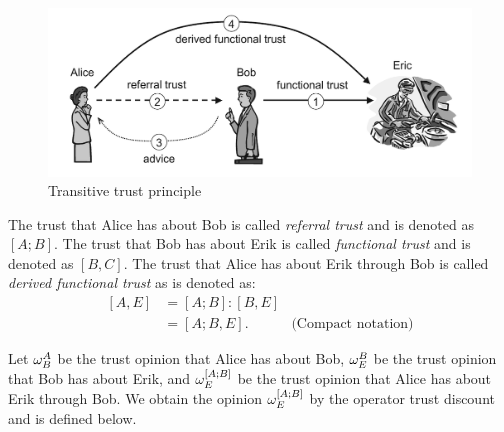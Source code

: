 \documentclass[a4paper,12pt]{article}
\theoremstyle{definition}
\numberwithin{equation}{section}
\begin{document}
\begin{figure}[htb]
	\centering
	\includegraphics[scale=0.4]{images/transitive-trust-principle.png}
	\caption{Transitive trust principle}
\end{figure}

The trust that Alice has about Bob is called \emph{referral trust} and is denoted as $[A; B]$. The trust that Bob has about Erik is called \emph{functional trust} and is denoted as $[B, C]$. The trust that Alice has about Erik through Bob is called \emph{derived functional trust} as is denoted as:
\begin{equation}
	\begin{array}{rll}
		[A, E] & = [A; B] : [B, E] \\
		& = [A; B, E] \text{.} & \text{(Compact notation)}
	\end{array}
\end{equation}

Let $\omega^{A}_{B}$ be the trust opinion that Alice has about Bob, $\omega^{B}_{E}$ be the trust opinion that Bob has about Erik, and $\omega^{[A;B]}_{E}$ be the trust opinion that Alice has about Erik through Bob. We obtain the opinion $\omega^{[A;B]}_{E}$ by the operator trust discount and is defined below.
\end{document}
